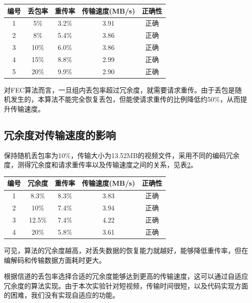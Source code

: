 \documentclass[onecolumn]{article}
\begin{document}
\begin{CJK*}{UTF8}{gbsn}
		\begin{table}[h]
			\centering
		\begin{tabular}{|c|c|c|c|c|}
			\hline 
			编号 & 丢包率 & 重传率 & 传输速度(MB/s) & 正确性\\ 
			\hline 
			1 & 5\% & 3.2\% & 3.91 & 正确\\ 
			\hline 
			2 & 8\% & 5.4\% & 3.86 & 正确\\ 
			\hline 
			3 & 10\% & 6.0\% & 3.86 & 正确\\ 
			\hline 
			4 & 15\% & 8.8\% & 2.99 & 正确\\ 
			\hline 
			5 & 20\% & 9.9\% & 2.90 & 正确\\
			\hline
		\end{tabular} 
		\label{table:missing_rate}
		\end{table}
		
		对FEC算法而言，一旦组内丢包率超过冗余度，就需要请求重传。由于丢包是随机发生的，本算法不能完全恢复丢包，但能使请求重传的比例降低约50\%，从而提升传输速度。
		
		\subsection{冗余度对传输速度的影响}
		保持随机丢包率为10\%，传输大小为13.52MB的视频文件，采用不同的编码冗余度，测得冗余度和请求重传率以及传输速度之间的关系，见表\ref{table:encoding}。
		
		\begin{table}[h]
			\centering
		\begin{tabular}{|c|c|c|c|c|}
			\hline 
			编号 & 冗余度 & 重传率 & 传输速度(MB/s) & 正确性 \\ 
			\hline 
			1 & 8.3\% & 8.3\% & 3.83 & 正确 \\ 
			\hline 
			2 & 10\% & 7.4\% & 3.94 & 正确 \\ 
			\hline 
			3 & 12.5\% & 7.4\% & 4.22 & 正确 \\ 
			\hline 
			4 & 20\% & 5.8\% & 3.61 & 正确 \\ 
			\hline 
		\end{tabular} 
		\label{table:encoding}
		\end{table}
	
		可见，算法的冗余度越高，对丢失数据的恢复能力就越好，能够降低重传率，但在编解码和传输数据方面耗时更大。
		
		根据信道的丢包率选择合适的冗余度能够达到更高的传输速度，这可以通过自适应冗余度的算法实现。由于本次实验针对短视频，传输时间很短，以及代码实现方面的困难，我们没有实现自适应的功能。
		

\end{CJK*}
\end{document}
